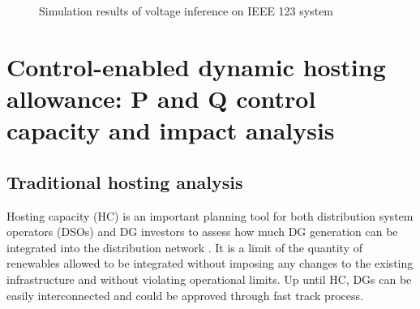 \documentclass{article}
\begin{document}
\begin{figure}[h!]
    \centering
{}
    \quad
{}
\caption{Simulation results of voltage inference on IEEE 123 system}
\end{figure}
 

\section{Control-enabled dynamic hosting allowance: P and Q control capacity and impact analysis}
\subsection{Traditional hosting analysis}
Hosting capacity (HC) is an important planning tool for both distribution system operators (DSOs) and DG investors to assess how much DG generation can be integrated into the distribution network \cite{ismael2019state}. It is a limit of the quantity of renewables allowed to be integrated without imposing any changes to the existing infrastructure and without
violating operational limits. Up until HC, DGs can be easily interconnected and could be approved through fast track process.
\end{document}
